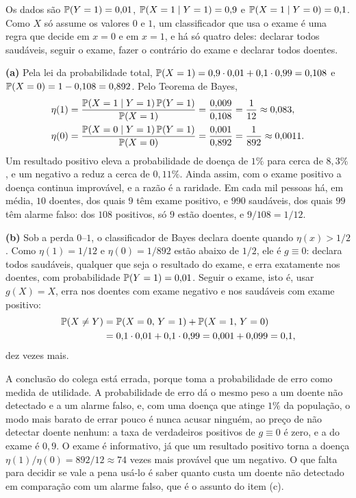 \begin{solucao}
Os dados são $\mathbb{P}(Y=1)=0{,}01$, $\mathbb{P}(X=1\mid Y=1)=0{,}9$ e $\mathbb{P}(X=1\mid Y=0)=0{,}1$. Como
$X$ só assume os valores $0$ e $1$, um classificador que usa o exame é uma regra que decide em
$x=0$ e em $x=1$, e há só quatro deles: declarar todos saudáveis, seguir o exame, fazer o
contrário do exame e declarar todos doentes.

\smallskip
\textbf{(a)} Pela lei da probabilidade total,
$\mathbb{P}(X=1)=0{,}9\cdot0{,}01+0{,}1\cdot0{,}99=0{,}108$ e $\mathbb{P}(X=0)=1-0{,}108=0{,}892$. Pelo
Teorema de Bayes,
\begin{align*}
  \eta(1)&=\frac{\mathbb{P}(X=1\mid Y=1)\,\mathbb{P}(Y=1)}{\mathbb{P}(X=1)}=\frac{0{,}009}{0{,}108}
          =\frac1{12}\approx0{,}083,\\
  \eta(0)&=\frac{\mathbb{P}(X=0\mid Y=1)\,\mathbb{P}(Y=1)}{\mathbb{P}(X=0)}=\frac{0{,}001}{0{,}892}
          =\frac1{892}\approx0{,}0011 .
\end{align*}
Um resultado positivo eleva a probabilidade de doença de $1\%$ para cerca de $8{,}3\%$, e um
negativo a reduz a cerca de $0{,}11\%$. Ainda assim, com o exame positivo a doença continua
improvável, e a razão é a raridade. Em cada mil pessoas há, em média, $10$ doentes, dos quais
$9$ têm exame positivo, e $990$ saudáveis, dos quais $99$ têm alarme falso: dos $108$ positivos,
só $9$ estão doentes, e $9/108=1/12$.

\smallskip
\textbf{(b)} Sob a perda $0$--$1$, o classificador de Bayes declara doente quando
$\eta(x)>1/2$. Como $\eta(1)=1/12$ e $\eta(0)=1/892$ estão abaixo de $1/2$, ele é $g\equiv0$:
declara todos saudáveis, qualquer que seja o resultado do exame, e erra exatamente nos doentes,
com probabilidade $\mathbb{P}(Y=1)=0{,}01$. Seguir o exame, isto é, usar $g(X)=X$, erra nos doentes
com exame negativo e nos saudáveis com exame positivo:
\begin{align*}
  \mathbb{P}(X\ne Y)&=\mathbb{P}(X=0,\,Y=1)+\mathbb{P}(X=1,\,Y=0)\\
  &=0{,}1\cdot0{,}01+0{,}1\cdot0{,}99=0{,}001+0{,}099=0{,}1 ,
\end{align*}
dez vezes mais.

A conclusão do colega está errada, porque toma a probabilidade de erro como medida de
utilidade. A probabilidade de erro dá o mesmo peso a um doente não detectado e a um alarme
falso, e, com uma doença que atinge $1\%$ da população, o modo mais barato de errar pouco é
nunca acusar ninguém, ao preço de não detectar doente nenhum: a taxa de verdadeiros positivos
de $g\equiv0$ é zero, e a do exame é $0{,}9$. O exame é informativo, já que um resultado
positivo torna a doença $\eta(1)/\eta(0)=892/12\approx74$ vezes mais provável que um negativo.
O que falta para decidir se vale a pena usá-lo é saber quanto custa um doente não detectado em
comparação com um alarme falso, que é o assunto do item (c).


\end{solucao}
